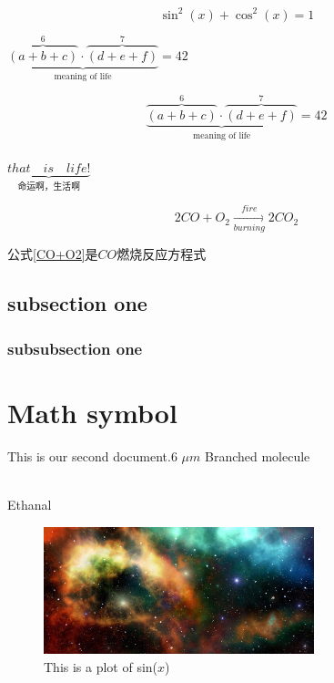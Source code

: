 \documentclass[a4paper,twoside]{report}
\begin{document}
\begin{equation}
\sin^2(x)+\cos^2(x) =1
\end{equation}

$\underbrace{\overbrace{(a+b+c)}^6
\cdot  \overbrace{(d+e+f)}^7}
_\text{meaning  of  life}  =  42$

$$\underbrace{\overbrace{(a+b+c)}^6
\cdot  \overbrace{(d+e+f)}^7}
_\text{meaning  of  life}  =  42$$\\
$\underbrace{that\quad is\quad life!}_\text{命运啊，生活啊}$

\begin{equation}
2CO + O_2\xrightarrow[burning]{fire}  2CO_2  
\label{CO+O2}
\end{equation}

公式\eqref{CO+O2}是$CO$燃烧反应方程式
\subsection{subsection one}
\zhlipsum[1-2]

\subsubsection{subsubsection one}
\zhlipsum[1-2]		
\newpage

\section{Math symbol}
This is our second document.6 $\mu m$ 
Branched molecule \vspace{.5cm}

\quad{}\vspace{1cm}\\

{ 
    \chemname
    {}    
    {Ethanal}
}\vspace{.5cm}
\begin{figure}[!h]
\centering
\includegraphics[width=0.7\textwidth]{Rplot}
\caption{This is a plot of sin($x$)}
\end{figure}
\end{document}
